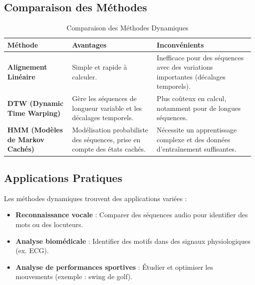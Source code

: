 \documentclass[a4paper,12pt,oneside]{report}	%
\begin{document}
        \subsection{Comparaison des Méthodes}
            \begin{table}[h!]
                \centering
                \renewcommand{\arraystretch}{1.5} %
                \begin{tabular}{|p{4cm}|p{5cm}|p{5cm}|}
                    \hline
                    \textbf{Méthode} & \textbf{Avantages} & \textbf{Inconvénients} \\
                    \hline
                    \textbf{Alignement Linéaire} & Simple et rapide à calculer. & Inefficace pour des séquences avec des variations importantes (décalages temporels). \\
                    \hline
                    \textbf{DTW (Dynamic Time Warping)} & Gère les séquences de longueur variable et les décalages temporels. & Plus coûteux en calcul, notamment pour de longues séquences. \\
                    \hline
                    \textbf{HMM (Modèles de Markov Cachés)} & Modélisation probabiliste des séquences, prise en compte des états cachés. & Nécessite un apprentissage complexe et des données d’entraînement suffisantes. \\
                    \hline
                \end{tabular}
                \caption{Comparaison des Méthodes Dynamiques}
                \label{tab:comparaison_methodes}
            \end{table}
        \subsection{Applications Pratiques}
            Les méthodes dynamiques trouvent des applications variées :
            \begin{itemize}
                \item \textbf{Reconnaissance vocale} : Comparer des séquences audio pour identifier des mots ou des locuteurs.
                \item \textbf{Analyse biomédicale} : Identifier des motifs dans des signaux physiologiques (ex. ECG).
                \item \textbf{Analyse de performances sportives} : Étudier et optimiser les mouvements (exemple : swing de golf).
            \end{itemize}
\end{document}
